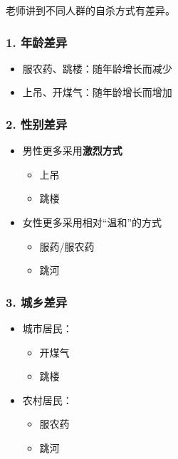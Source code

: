 \documentclass[
  chinese,
  9pt,
  a4paper,
]{ctexart}
\providecommand{\tightlist}{%
  \setlength{\itemsep}{0pt}\setlength{\parskip}{0pt}}
\begin{document}
老师讲到不同人群的自杀方式有差异。

\subsubsection{1. 年龄差异}\label{ux5e74ux9f84ux5deeux5f02}

\begin{itemize}
\tightlist
\item
  服农药、跳楼：随年龄增长而减少
\item
  上吊、开煤气：随年龄增长而增加
\end{itemize}

\subsubsection{2. 性别差异}\label{ux6027ux522bux5deeux5f02-2}

\begin{itemize}
\item
  男性更多采用\textbf{激烈方式}

  \begin{itemize}
  \tightlist
  \item
    上吊
  \item
    跳楼
  \end{itemize}
\item
  女性更多采用相对``温和''的方式

  \begin{itemize}
  \tightlist
  \item
    服药/服农药
  \item
    跳河
  \end{itemize}
\end{itemize}

\subsubsection{3. 城乡差异}\label{ux57ceux4e61ux5deeux5f02}

\begin{itemize}
\item
  城市居民：

  \begin{itemize}
  \tightlist
  \item
    开煤气
  \item
    跳楼
  \end{itemize}
\item
  农村居民：

  \begin{itemize}
  \tightlist
  \item
    服农药
  \item
    跳河
  \end{itemize}
\end{itemize}
\end{document}
